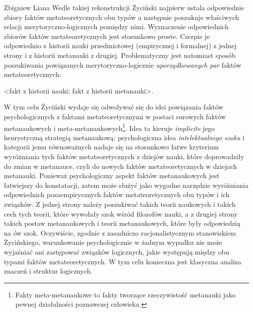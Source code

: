\begin{artplenv}{Zbigniew Liana}
Wedle takiej rekonstrukcji Życiński najpierw ustala odpowiednie zbiory faktów metateoretycznych obu typów a następnie
poszukuje właściwych relacji merytoryczno-logicznych pomiędzy nimi. Wyznaczenie odpowiednich zbiorów faktów
metateoretycznych jest stosunkowo proste. Czerpie je odpowiednio z historii nauki przedmiotowej (empirycznej i
formalnej) z jednej strony i z historii metanauki z drugiej. Problematyczny jest natomiast sposób poszukiwania
powiązanych merytoryczno-logicznie \textit{uporządkowanych par} faktów metateoretycznych: 

{\textless}fakt z historii nauki; fakt z historii metanauki{\textgreater}. 

W tym celu Życiński wydaje się odwoływać się do idei powiązania faktów psychologicznych z faktami metateoretycznymi w
postaci surowych faktów metanaukowych i meta-metanaukowych\footnote{Fakty meta-metanaukowe to fakty tworzące
	rzeczywistość metanauki jako pewnej działalności poznawczej człowieka.}. Idea ta kieruje \textit{implicite} jego
heurystyczną strategią metanaukową: psychologiczna idea \textit{intelektualnego szoku} i kategorii jemu równoważnych
nadaje się na stosunkowo łatwe kryterium wyróżniania tych faktów metateoretycznych z dziejów nauki, które doprowadziły
do zmian w metanauce, czyli do nowych faktów metateoretycznych w dziejach metanauki. Ponieważ psychologiczny aspekt
faktów metanaukowych jest łatwiejszy do konstatacji, zatem może służyć jako wygodne narzędzie wyróżniania odpowiednich
pozaempirycznych faktów metateoretycznych obu typów i ich związków. Z jednej strony należy poszukiwać takich teorii
naukowych i takich cech tych teorii, które wywołały szok wśród filozofów nauki, a z drugiej strony takich postaw
metanaukowych i teorii metanaukowych, które były odpowiedzią na ów szok. Oczywiście, zgodnie z zasadniczo
racjonalistycznym stanowiskiem Życińskiego, warunkowanie psychologicznie w żadnym wypadku nie może wyjaśniać ani
zastępować związków logicznych, jakie występują między obu typami faktów metateoretycznych. W tym celu konieczna jest
klasyczna analiza znaczeń i struktur logicznych.


\end{artplenv}
